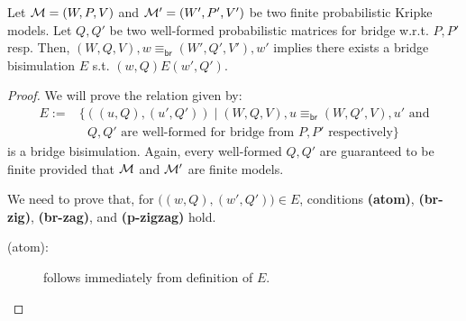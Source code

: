\begin{theorem}
     Let $\mathcal{M}=(W,P,V)$ and $\mathcal{M}'=(W',P',V')$ be two finite probabilistic Kripke models.
    Let ${Q},{Q'}$ be two well-formed probabilistic matrices for bridge w.r.t. $P,P'$ resp.  
    Then, $(W,{Q},V),w\equiv_{\mathsf{br}}(W',{Q}',V'),w'$ implies there exists a bridge bisimulation $E$ s.t. $(w,{Q})E(w',{Q}')$.
\end{theorem}
\begin{proof}
We will prove the relation given by:
\begin{align*}
    E := & \{ ((u,{Q}),(u',{Q}')) \mid  (W,{Q},V), u \equiv_{\mathsf{br}} (W,{Q}',V) , u ' \text{ and} \\
    & \text{ ${Q},{Q'}$ are well-formed for bridge from $P,P'$ respectively} \} 
\end{align*}
is a bridge bisimulation. Again, every well-formed ${Q},{Q'}$ are guaranteed to be finite provided that $\mathcal{M}$ and $\mathcal{M}'$ are finite models.

We need to prove that, for  $\big((w,{Q}) ,(w',{Q}')\big)\in E$, conditions \textbf{(atom)}, \textbf{(br-zig)}, \textbf{(br-zag)}, and \textbf{(p-zigzag)} hold. 

\begin{description}
    \item[(atom):] follows immediately from definition of $E$. 



\end{description}
\end{proof}
